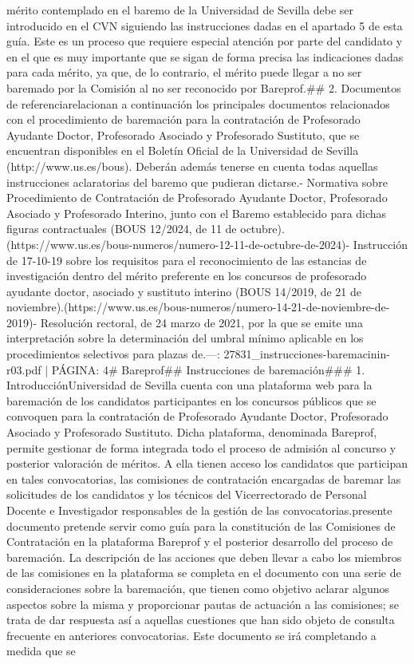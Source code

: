 \documentclass{article}
\begin{document}
\begin{itemize}
mérito contemplado en el baremo de la Universidad de Sevilla debe ser introducido en el CVN siguiendo las instrucciones dadas en el apartado 5 de esta guía. Este es un proceso que requiere especial atención por parte del candidato y en el que es muy importante que se sigan de forma precisa las indicaciones dadas para cada mérito, ya que, de lo contrario, el mérito puede llegar a no ser baremado por la Comisión al no ser reconocido por Bareprof.\n\n## 2. Documentos de referencia\n\nSe relacionan a continuación los principales documentos relacionados con el procedimiento de baremación para la contratación de Profesorado Ayudante Doctor, Profesorado Asociado y Profesorado Sustituto, que se encuentran disponibles en el Boletín Oficial de la Universidad de Sevilla (http://www.us.es/bous). Deberán además tenerse en cuenta todas aquellas instrucciones aclaratorias del baremo que pudieran dictarse.\n\n- Normativa sobre Procedimiento de Contratación de Profesorado Ayudante Doctor, Profesorado Asociado y Profesorado Interino, junto con el Baremo establecido para dichas figuras contractuales (BOUS 12/2024, de 11 de octubre).(https://www.us.es/bous-numeros/numero-12-11-de-octubre-de-2024)\n\n- Instrucción de 17-10-19 sobre los requisitos para el reconocimiento de las estancias de investigación dentro del mérito preferente en los concursos de profesorado ayudante doctor, asociado y sustituto interino (BOUS 14/2019, de 21 de noviembre).(https://www.us.es/bous-numeros/numero-14-21-de-noviembre-de-2019)\n\n- Resolución rectoral, de 24 marzo de 2021, por la que se emite una interpretación sobre la determinación del umbral mínimo aplicable en los procedimientos selectivos para plazas de.\n\n---\n\nFUENTE: 27831_instrucciones-baremacinin-r03.pdf | PÁGINA: 4\n# Bareprof\n## Instrucciones de baremación\n\n### 1. Introducción\n\nLa Universidad de Sevilla cuenta con una plataforma web para la baremación de los candidatos participantes en los concursos públicos que se convoquen para la contratación de Profesorado Ayudante Doctor, Profesorado Asociado y Profesorado Sustituto. Dicha plataforma, denominada Bareprof, permite gestionar de forma integrada todo el proceso de admisión al concurso y posterior valoración de méritos. A ella tienen acceso los candidatos que participan en tales convocatorias, las comisiones de contratación encargadas de baremar las solicitudes de los candidatos y los técnicos del Vicerrectorado de Personal Docente e Investigador responsables de la gestión de las convocatorias.\n\nEl presente documento pretende servir como guía para la constitución de las Comisiones de Contratación en la plataforma Bareprof y el posterior desarrollo del proceso de baremación. La descripción de las acciones que deben llevar a cabo los miembros de las comisiones en la plataforma se completa en el documento con una serie de consideraciones sobre la baremación, que tienen como objetivo aclarar algunos aspectos sobre la misma y proporcionar pautas de actuación a las comisiones; se trata de dar respuesta así a aquellas cuestiones que han sido objeto de consulta frecuente en anteriores convocatorias. Este documento se irá completando a medida que se 
\end{itemize}
\end{document}
